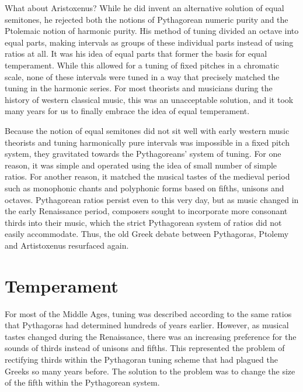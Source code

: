 What about Aristoxenus?  While he did invent an alternative solution of equal
semitones, he rejected both the notions of Pythagorean numeric purity and the
Ptolemaic notion of harmonic purity.  His method of tuning divided an octave
into equal parts, making intervals as groups of these individual parts instead
of using ratios at all.  It was his idea of equal parts that former the basis for
equal temperament.  While this allowed for a tuning of fixed pitches in a chromatic scale,
none of these intervals were tuned in a way that precisely matched the tuning in the harmonic
series.  For most theorists and musicians during the history of western
classical music, this was an unacceptable solution, and it took many years for
us to finally embrace the idea of equal temperament.

Because the notion of equal semitones did not sit well with early western music
theorists and tuning harmonically pure intervals was impossible in a fixed pitch
system, they gravitated towards the Pythagoreans' system of tuning.  For one
reason, it was simple and operated using the idea of small number of simple
ratios.  For another reason, it matched the musical tastes of the medieval
period such as monophonic chants and polyphonic forms based on fifths, unisons
and octaves.  Pythagorean ratios persist even to this very day, but as music
changed in the early Renaissance period, composers sought to incorporate more
consonant thirds into their music, which the strict Pythagorean system of ratios
did not easily accommodate.  Thus, the old Greek debate between Pythagoras,
Ptolemy and Artistoxenus resurfaced again.

\section{Temperament}

For most of the Middle Ages, tuning was described according to the same
ratios that Pythagoras had determined hundreds of years earlier. However, as
musical tastes changed during the Renaissance, there was an increasing
preference for the sounds of thirds instead of unisons and fifths. This
represented the problem of rectifying thirds within the Pythagoran tuning
scheme that had plagued the Greeks so many years before. The solution
to the problem was to change the size of the fifth within the Pythagorean
system.

